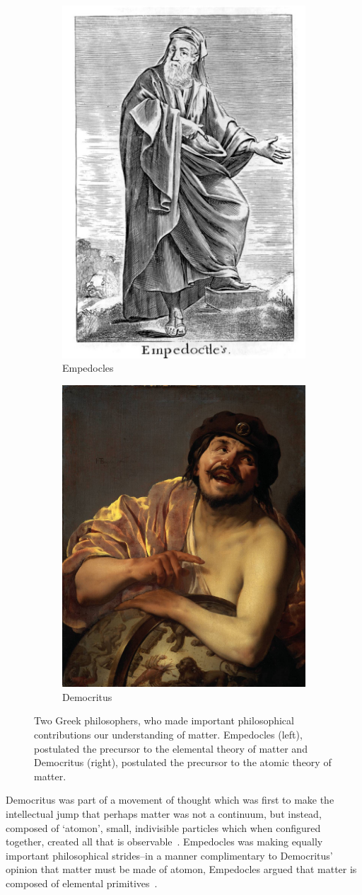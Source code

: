 \begin{figure}[ht]
	\centering
	\begin{subfigure}{.5\textwidth}
		\centering
		\includegraphics[width=0.4\linewidth]{./figures/empedocles.jpg}
		\caption{Empedocles \cite{Stanley1655}}
		\label{fig:empedocles}
	\end{subfigure}%
	\begin{subfigure}{0.5\textwidth}
		\centering
		\includegraphics[width=0.4\linewidth]{./figures/democritus.jpg}
		\caption{Democritus \cite{Brugghen1628}}
		\label{fig:democritus}
	\end{subfigure}
  \caption{ 
    Two Greek philosophers, who made important philosophical
    contributions our understanding of matter. Empedocles (left), postulated the
    precursor to the elemental theory of matter\cite{Long1949} and Democritus
    (right), postulated the precursor to the atomic theory of matter.  
  }
	\label{fig:atomists}
\end{figure}

Democritus was part of a movement of thought which was first to make the
intellectual jump that perhaps matter was not a continuum, but instead, composed
of `atomon', small, indivisible particles which when configured together, created
all that is observable~\cite{Baldes1978}. Empedocles was making equally important
philosophical strides--in a manner complimentary to Democritus' opinion that
matter must be made of atomon, Empedocles argued that matter is composed of
elemental primitives~\cite{Long1949}.

